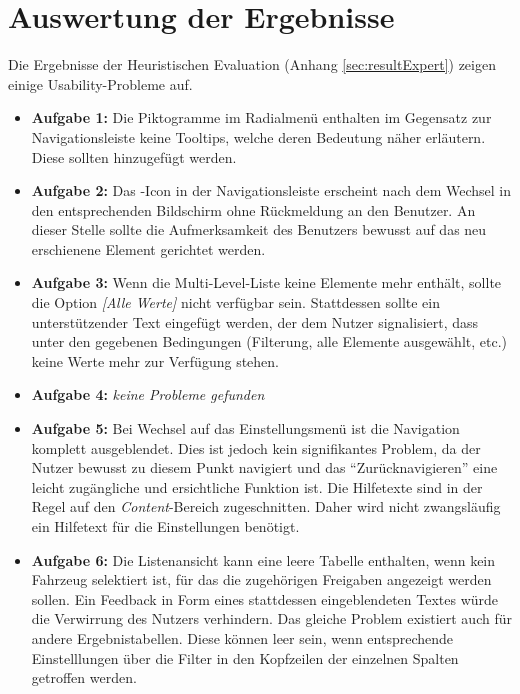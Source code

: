 \section{Auswertung der Ergebnisse} \label{sec:analysisConclusion}
Die Ergebnisse der Heuristischen Evaluation (Anhang \ref{sec:resultExpert}) zeigen einige Usability-Probleme auf.\par
\begin{itemize}
 \item \textbf{Aufgabe 1:} Die Piktogramme im Radialmenü enthalten im Gegensatz zur Navigationsleiste keine Tooltips, welche deren Bedeutung näher erläutern. Diese sollten hinzugefügt werden.
 \item \textbf{Aufgabe 2:} Das -Icon in der Navigationsleiste erscheint nach dem Wechsel in den entsprechenden Bildschirm ohne Rückmeldung an den Benutzer. An dieser Stelle sollte die Aufmerksamkeit des Benutzers bewusst auf das neu erschienene Element gerichtet werden.
 \item \textbf{Aufgabe 3:} Wenn die Multi-Level-Liste keine Elemente mehr enthält, sollte die Option \textit{[Alle Werte]} nicht verfügbar sein. Stattdessen sollte ein unterstützender Text eingefügt werden, der dem Nutzer signalisiert, dass unter den gegebenen Bedingungen (Filterung, alle Elemente ausgewählt, etc.) keine Werte mehr zur Verfügung stehen.
 \item \textbf{Aufgabe 4:} \textit{keine Probleme gefunden}
 \item \textbf{Aufgabe 5:} Bei Wechsel auf das Einstellungsmenü ist die Navigation komplett ausgeblendet. Dies ist jedoch kein signifikantes Problem, da der Nutzer bewusst zu diesem Punkt navigiert und das \enquote{Zurücknavigieren} eine leicht zugängliche und ersichtliche Funktion ist. Die Hilfetexte sind in der Regel auf den \textit{Content}-Bereich zugeschnitten. Daher wird nicht zwangsläufig ein Hilfetext für die Einstellungen benötigt.
 \item \textbf{Aufgabe 6:} Die Listenansicht kann eine leere Tabelle enthalten, wenn kein Fahrzeug selektiert ist, für das die zugehörigen Freigaben angezeigt werden sollen. Ein Feedback in Form eines stattdessen eingeblendeten Textes würde die Verwirrung des Nutzers verhindern. Das gleiche Problem existiert auch für andere Ergebnistabellen. Diese können leer sein, wenn entsprechende Einstelllungen über die Filter in den Kopfzeilen der einzelnen Spalten getroffen werden.
\end{itemize}
